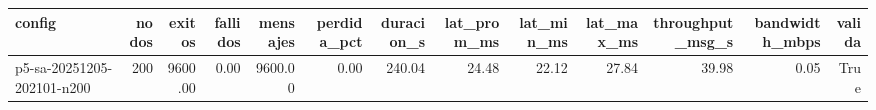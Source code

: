 \begin{tabular}{lrrrrrrrrrrrr}
\toprule
config & nodos & exitos & fallidos & mensajes & perdida_pct & duracion_s & lat_prom_ms & lat_min_ms & lat_max_ms & throughput_msg_s & bandwidth_mbps & valida \\
\midrule
p5-sa-20251205-202101-n200 & 200 & 9600.00 & 0.00 & 9600.00 & 0.00 & 240.04 & 24.48 & 22.12 & 27.84 & 39.98 & 0.05 & True \\
\bottomrule
\end{tabular}
